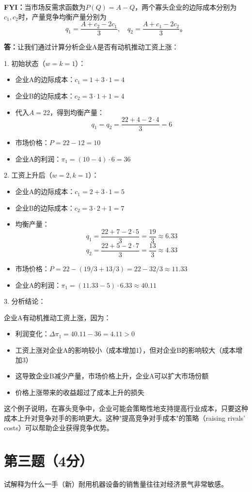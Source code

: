 \documentclass[12pt]{article}
\begin{document}
\noindent\textbf{FYI：}当市场反需求函数为$P(Q)=A-Q$，两个寡头企业的边际成本分别为$c_1,c_2$时，产量竞争均衡产量分别为
\[q_1=\frac{A+c_2-2c_1}{3},\quad q_2=\frac{A+c_1-2c_2}{3}。\]

\noindent\textbf{答：}让我们通过计算分析企业A是否有动机推动工资上涨：

1. 初始状态（$w=k=1$）：
\begin{itemize}
\item 企业A的边际成本：$c_1=1+3\cdot1=4$
\item 企业B的边际成本：$c_2=3\cdot1+1=4$
\item 代入$A=22$，得到均衡产量：
\[q_1=q_2=\frac{22+4-2\cdot4}{3}=6\]
\item 市场价格：$P=22-12=10$
\item 企业A的利润：$\pi_1=(10-4)\cdot6=36$
\end{itemize}

2. 工资上升后（$w=2,k=1$）：
\begin{itemize}
\item 企业A的边际成本：$c_1=2+3\cdot1=5$
\item 企业B的边际成本：$c_2=3\cdot2+1=7$
\item 均衡产量：
\[q_1=\frac{22+7-2\cdot5}{3}=\frac{19}{3}\approx6.33\]
\[q_2=\frac{22+5-2\cdot7}{3}=\frac{13}{3}\approx4.33\]
\item 市场价格：$P=22-(19/3+13/3)=22-32/3\approx11.33$
\item 企业A的利润：$\pi_1=(11.33-5)\cdot6.33\approx40.11$
\end{itemize}

3. 分析结论：

企业A有动机推动工资上涨，因为：
\begin{itemize}
\item 利润变化：$\Delta\pi_1=40.11-36=4.11>0$
\item 工资上涨对企业A的影响较小（成本增加1），但对企业B的影响较大（成本增加3）
\item 这导致企业B减少产量，市场价格上升，企业A可以扩大市场份额
\item 价格上涨带来的收益超过了成本上升的损失
\end{itemize}

这个例子说明，在寡头竞争中，企业可能会策略性地支持提高行业成本，只要这种成本上升对竞争对手的影响更大。这种"提高竞争对手成本"的策略（raising rivals' costs）可以帮助企业获得竞争优势。

\section*{第三题（4分）}
试解释为什么一手（新）耐用机器设备的销售量往往对经济景气非常敏感。
\end{document}
